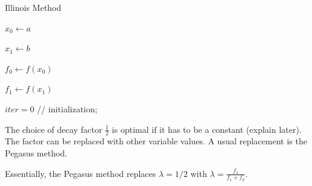 \begin{algorithm}[!htb]
    \SetAlgoLined
    \caption{Illinois Method}
    $x_0\gets a$
    
    $x_1\gets b$
    
    $f_0\gets f(x_0)$
    
    $f_1\gets f(x_1)$
    
    $iter = 0$ //    initialization; 
    \\
    \label{ALG: ILLINOIS}
\end{algorithm}


\begin{remark}
The choice of decay factor $\frac{1}{2}$ is optimal if it has to be a constant (explain later). The factor can be replaced with other variable values. A usual replacement is the Pegasus method.

Essentially, the Pegasus method replaces $\lambda = 1/2$ with $\lambda=\frac{f_1}{f_1 + f_2}$.

\end{remark}

